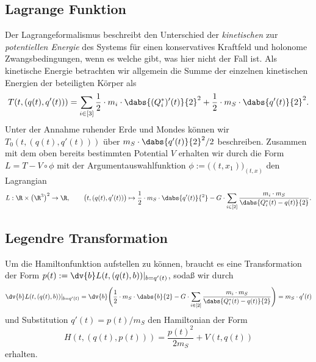 \documentclass{subfiles}
\begin{document}
    \subsection*{Lagrange Funktion}
        Der Lagrangeformalismus beschreibt den Unterschied der \emph{kinetischen} zur \emph{potentiellen Energie} des Systems für einen konservatives Kraftfeld und holonome Zwangsbedingungen, wenn es welche gibt, was hier nicht der Fall ist. Als kinetische Energie betrachten wir allgemein die Summe der einzelnen kinetischen Energien der beteiligten Körper als
        \[
            T(t,(q(t),q'(t))) = \sum_{i\in[3]}\frac12\cdot m_i\cdot\dabs{(Q_i^*)'(t)}{2}^2 + \frac12\cdot m_S\cdot\dabs{q'(t)}{2}^2.
        \]
        Unter der Annahme ruhender Erde und Mondes können wir $T_0(t,(q(t),q'(t)))$ über $m_S\cdot \dabs{q'(t)}{2}^2 / 2$ beschreiben. Zusammen mit dem oben bereits bestimmten Potential $V$ erhalten wir durch die Form $L = T - V\circ\phi$ mit der Argumentauswahlfunktion $\phi:=\bigl((t,x_1)\bigr)_{(t,x)}$ den Lagrangian
        \[
            L:\R\times\bigl(\R^3\bigr)^2\to\R,\qquad \bigl(t,(q(t),q'(t))\bigr)\mapsto \frac12\cdot m_S\cdot\dabs{q'(t)}{^2} - G\cdot\sum_{i\in[2]}\frac{m_i\cdot m_S}{\dabs{Q_i^*(t) - q(t)}{2}}.
        \]
        

    \subsection*{Legendre Transformation}
        Um die Hamiltonfunktion aufstellen zu können, braucht es eine Transformation der Form $p(t):=\dv{b}L(t,(q(t),b))|_{b=q'(t)}$, sodaß wir durch 
        \[
            \dv{b}L(t,(q(t),b))|_{b=q'(t)} = \dv{b}\Biggl(
                \frac12\cdot m_S\cdot\dabs{b}{2} - G\cdot\sum_{i\in[2]}\frac{m_i\cdot m_S}{\dabs{Q_i^*(t) - q(t)}{2}}    
            \Biggr)
            = m_S\cdot q'(t)
        \]
        und Substitution $q'(t) = p(t) / m_S$ den Hamiltonian der Form 
        \[
            H(t,(q(t),p(t))) = \frac{p(t)^2}{2m_S} + V(t,q(t))
        \]
        erhalten. 
\end{document}
